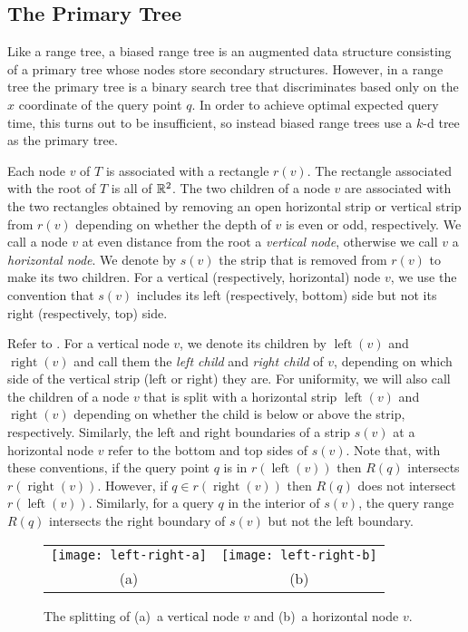 \documentclass[lotsofwhite,charterfonts]{patmorin}
\DeclareMathOperator{\lft}{left}
\DeclareMathOperator{\rght}{right}
\begin{document}
\subsection{The Primary Tree}

Like a range tree, a biased range tree is an augmented data structure
consisting of a primary tree whose nodes store secondary structures.
However, in a range tree the primary tree is a binary search tree that
discriminates based only on the $x$ coordinate of the query point
$q$.  In order to achieve optimal expected query time, this turns out
to be insufficient, so instead biased range trees use a $k$-d tree
as the primary tree.

Each node $v$ of $T$ is associated with a rectangle $r(v)$.  The
rectangle associated with the root of $T$ is all of $\mathbb{R}^2$. The two
children of a node $v$ are associated with the two rectangles obtained
by removing an open horizontal strip or vertical strip from $r(v)$
depending on whether the depth of $v$ is even or odd, respectively.
We call a node $v$ at even distance from the root a \emph{vertical
node}, otherwise we call $v$ a \emph{horizontal node}.  We denote by
$s(v)$ the strip that is removed from $r(v)$ to make its two children.
For a vertical (respectively, horizontal) node $v$, we use the
convention that $s(v)$ includes its left (respectively, bottom) side
but not its right (respectively, top) side.

Refer to .
For a vertical node $v$, we denote its children by $\lft(v)$ and
$\rght(v)$ and call them the \emph{left child} and \emph{right child}
of $v$, depending on which side of the vertical strip (left or right)
they are.  For uniformity, we will also call the children of a node
$v$ that is split with a horizontal strip $\lft(v)$ and $\rght(v)$
depending on whether the child is below or above the strip,
respectively.  Similarly, the left and right boundaries of a strip
$s(v)$ at a horizontal node $v$ refer to the bottom and top sides of
$s(v)$.  Note that, with these conventions, if the query point $q$ is
in $r(\lft(v))$ then $R(q)$ intersects $r(\rght(v))$.  However, if
$q\in r(\rght(v))$ then $R(q)$ does not intersect $r(\lft(v))$.
Similarly, for a query $q$ in the interior of $s(v)$, the query range
$R(q)$ intersects the right boundary of $s(v)$ but not the left
boundary.

\begin{figure}
  \begin{center}
    \begin{tabular}{cc}
      \texttt{[image: left-right-a]} & \texttt{[image: left-right-b]} \\
      (a) & (b)
    \end{tabular}
  \end{center}
  \caption{The splitting of (a)~a vertical node $v$ and (b)~a horizontal
  node $v$.}
\end{figure}
\end{document}
